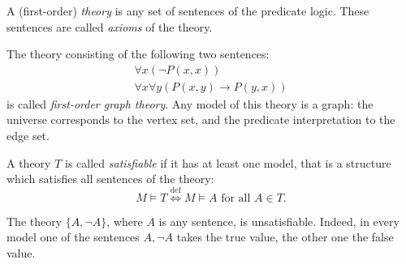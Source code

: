 \begin{page}
\setcounter{section}{3}
\setcounter{subsection}{1}
\setcounter{dfn}{1}
\label{portion:659}

\begin{dfn}
A (first-order) \emph{theory} is any set of sentences of the predicate logic.
These sentences are called \emph{axioms} of the theory.
\end{dfn}

\end{page}

\begin{page}
\setcounter{section}{3}
\setcounter{subsection}{1}
\setcounter{dfn}{2}
\label{portion:662}

\begin{exl}
\label{exl:FirstGraphTheory}
The theory consisting of the following two sentences:
\begin{gather*}
\forall x (\neg P(x,x))\\
\forall x \forall y (P(x,y) \to P(y,x))
\end{gather*}
is called \emph{first-order graph theory}.
Any model of this theory is a graph:
the universe corresponds to the vertex set, and the predicate interpretation to the edge set.

\end{exl}

\end{page}

\begin{page}
\setcounter{section}{3}
\setcounter{subsection}{1}
\setcounter{dfn}{3}
\label{portion:665}

\begin{dfn}
A theory $T$ is called \emph{satisfiable} if it has at least one model,
that is a structure which satisfies all sentences of the theory:
\[
M \vDash T \stackrel{\mathrm{def}}{\Longleftrightarrow} M \vDash A \text{ for all }A \in T.
\]
\end{dfn}

\end{page}

\begin{page}
\setcounter{section}{3}
\setcounter{subsection}{1}
\setcounter{dfn}{4}
\label{portion:668}

\begin{exl}
The theory $\{A, \neg A\}$, where $A$ is any sentence, is unsatisfiable.
Indeed, in every model one of the sentences $A, \neg A$ takes the true value, the other one the false value.
\end{exl}

\end{page}

